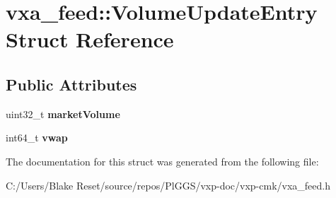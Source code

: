 \hypertarget{structvxa__feed_1_1_volume_update_entry}{}\section{vxa\+\_\+feed\+::Volume\+Update\+Entry Struct Reference}
\label{structvxa__feed_1_1_volume_update_entry}
\subsection*{Public Attributes}
\begin{DoxyCompactItemize}
\item 
\mbox{\label{structvxa__feed_1_1_volume_update_entry_aa09fe74044991a290926a2d3daa5efe4}} 
uint32\+\_\+t {\bfseries market\+Volume}
\item 
\mbox{\label{structvxa__feed_1_1_volume_update_entry_a6af617de8572fc8ece9741185e12daf2}} 
int64\+\_\+t {\bfseries vwap}
\end{DoxyCompactItemize}


The documentation for this struct was generated from the following file\+:\begin{DoxyCompactItemize}
\item 
C\+:/\+Users/\+Blake Reset/source/repos/\+Pl\+G\+G\+S/vxp-\/doc/vxp-\/cmk/vxa\+\_\+feed.\+h\end{DoxyCompactItemize}
